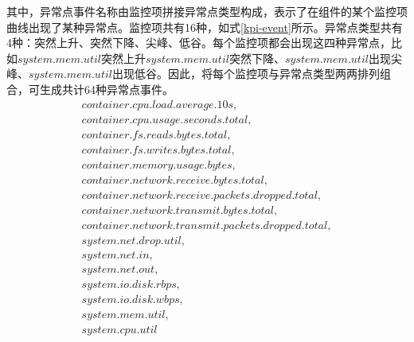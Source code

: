 其中，异常点事件名称由监控项拼接异常点类型构成，表示了在组件的某个监控项曲线出现了某种异常点。监控项共有16种，如式\ref{kpi-event}所示。异常点类型共有4种：突然上升、突然下降、尖峰、低谷。每个监控项都会出现这四种异常点，比如$system.mem.util$突然上升$system.mem.util$突然下降、$system.mem.util$出现尖峰、$system.mem.util$出现低谷。因此，将每个监控项与异常点类型两两排列组合，可生成共计64种异常点事件。
\begin{equation}
    \begin{array}{l}
        container.cpu.load.average.10s,\\
        container.cpu.usage.seconds.total,\\
        container.fs.reads.bytes.total,\\
        container.fs.writes.bytes.total,\\
        container.memory.usage.bytes,\\
        container.network.receive.bytes.total,\\
        container.network.receive.packets.dropped.total,\\
        container.network.transmit.bytes.total,\\
        container.network.transmit.packets.dropped.total,\\
        system.net.drop.util,\\
        system.net.in,\\
        system.net.out,\\
        system.io.disk.rbps,\\
        system.io.disk.wbps,\\
        system.mem.util,\\
        system.cpu.util\\ 
    \end{array}
    \label{kpi-event}
\end{equation}


